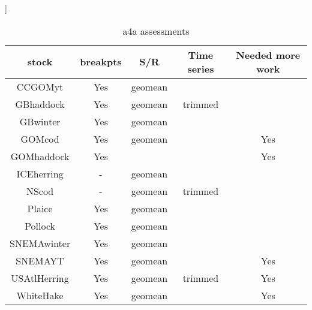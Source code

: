\documentclass[12pt,letterpaper, leqno]{article}
\begin{document}
\begin{table}
	\begin{center}]
	\begin{tabular}{ccccc}
		\hline 
		stock & breakpts & S/R & Time series & Needed more work \\
		\hline 
		\hline 
		CCGOMyt &  Yes & geomean &  & \\
		GBhaddock & Yes & geomean & trimmed &  \\
		GBwinter & Yes & geomean &  & \\
		GOMcod & Yes & geomean &  & Yes \\
		GOMhaddock & Yes &  &  & Yes\\
		ICEherring & - & geomean & \\
		NScod & - & geomean & trimmed \\
		Plaice & Yes & geomean & \\
		Pollock & Yes & geomean &  \\
		SNEMAwinter & Yes & geomean &  \\
		SNEMAYT & Yes & geomean &  & Yes \\
		USAtlHerring & Yes & geomean & trimmed & Yes \\
		WhiteHake & Yes & geomean &  & Yes \\
		\hline 
	\end{tabular} 
	\caption{a4a assessments}
	\end{center}
\end{table}
\end{document}
